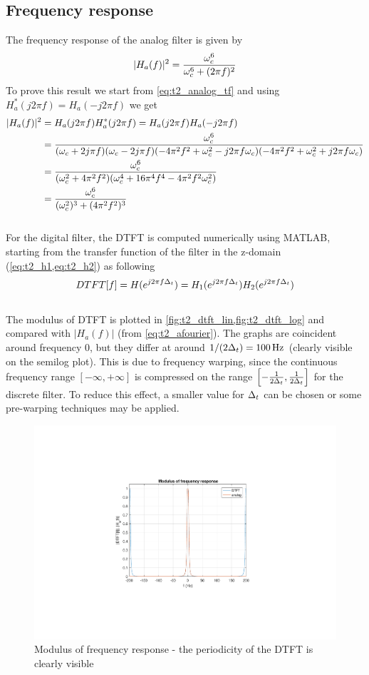 \subsection{Frequency response}
The frequency response of the analog filter is given by
\begin{equation}\label{eq:t2_afourier}
|H_a(f)|^2=\frac{\omega_c^6}{\omega_c^6+(2 \pi f)^2} 
\end{equation}
To prove this result we start from \cref{eq:t2_analog_tf} and using $H_a^*(j2\pi f)=H_a(-j2\pi f)$ we get
\begin{align*}
|H_a(f)|^2&=H_a(j2\pi f) H_a^*(j2\pi f)=H_a(j2\pi f) H_a(-j2\pi f)\\
&=\frac{\omega_c^6}{(\omega_c+2j\pi f)(\omega_c-2j\pi f)(-4\pi^2f^2+\omega_c^2-j2\pi f\omega_c)(-4\pi^2f^2+\omega_c^2+j2\pi f\omega_c)}\\
&=\frac{\omega_c^6}{(\omega_c^2+4\pi^2 f^2)(\omega_c^4+16\pi^4f^4-4\pi^2 f^2 \omega_c^2)}\\
&=\frac{\omega_c^6}{(\omega_c^2)^3+(4 \pi^2 f^2)^3}
\end{align*}
\\
For the digital filter, the DTFT is computed numerically using MATLAB, starting from the transfer function of the filter in the z-domain (\cref{eq:t2_h1,eq:t2_h2}) as following
\begin{equation*}
DTFT[f]=H (e^{j 2 \pi f \Delta_t} )=H_1 (e^{j 2 \pi f \Delta_t} ) H_2 (e^{j 2 \pi f \Delta_t })
\end{equation*}
\\
The modulus of DTFT is plotted in \cref{fig:t2_dtft_lin,fig:t2_dtft_log} and compared with $|H_a(f)|$ (from \cref{eq:t2_afourier}). The graphs are coincident around frequency 0, but they differ at around $1/(2\Delta_t)=\SI{100}{\hertz}$ (clearly visible on the semilog plot). This is due to frequency warping, since the continuous frequency range $[-\infty, +\infty]$ is compressed on the range $\left [-\frac{1}{2\Delta_t}, \frac{1}{2\Delta_t}\right ]$ for the discrete filter. To reduce this effect, a smaller value for $\Delta_t$ can be chosen or some pre-warping techniques may be applied.
\begin{figure} [H]
	\centering
	\includegraphics[trim={8cm 4.8cm 8cm 5cm}, clip, width=0.8\linewidth]{frequency_resp_lin}
	\caption{Modulus of frequency response - the periodicity of the DTFT is clearly visible}
	\label{fig:t2_dtft_lin}
\end{figure}
